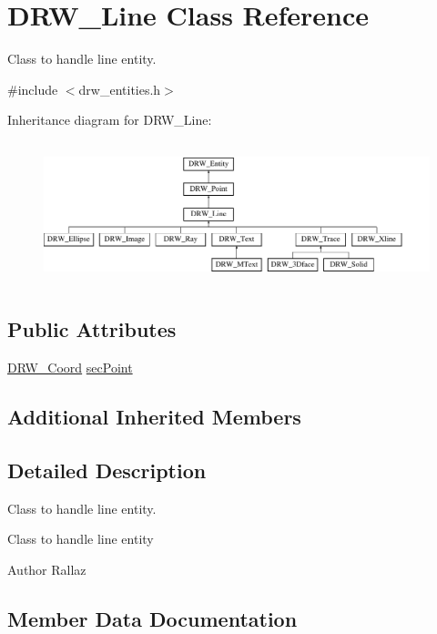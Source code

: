 \hypertarget{class_d_r_w___line}{}\section{D\+R\+W\+\_\+\+Line Class Reference}
\label{class_d_r_w___line}


Class to handle line entity.  




{\ttfamily \#include $<$drw\+\_\+entities.\+h$>$}

Inheritance diagram for D\+R\+W\+\_\+\+Line\+:\begin{figure}[H]
\begin{center}
\leavevmode
\includegraphics[height=4.166667cm]{d8/dc4/class_d_r_w___line}
\end{center}
\end{figure}
\subsection*{Public Attributes}
\begin{DoxyCompactItemize}
\item 
\hyperlink{class_d_r_w___coord}{D\+R\+W\+\_\+\+Coord} \hyperlink{class_d_r_w___line_afba62212864227b610be3e2a4e7ac307}{sec\+Point}
\end{DoxyCompactItemize}
\subsection*{Additional Inherited Members}


\subsection{Detailed Description}
Class to handle line entity. 

Class to handle line entity \begin{DoxyAuthor}{Author}
Rallaz 
\end{DoxyAuthor}


\subsection{Member Data Documentation}
\hypertarget{class_d_r_w___line_afba62212864227b610be3e2a4e7ac307}{}
